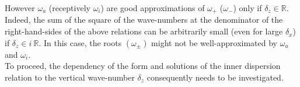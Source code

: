\documentclass[a4paper,11pt]{article}
\begin{document}
However $\omega_a$ (receptively $\omega_i$) are good approximations of $\omega_+$ ($\omega_-$) only if $\delta_z\in\mathbb{R}$. Indeed, the sum of the square of the wave-numbers at the denominator of the right-hand-sides of the above relations can be arbitrarily small (even for large $\delta_x$) if $\delta_z\in i \ \mathbb{R}$. In this case, the roots $(\omega_\pm)$ might not be well-approximated by $\omega_a$ and $\omega_i$.\\
To proceed, the dependency of the form and solutions of the inner dispersion relation to the vertical wave-number $\delta_z$ consequently needs to be investigated.


\end{document}
